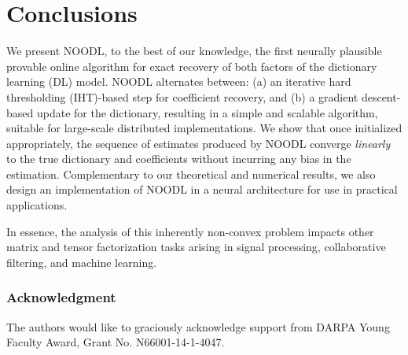 \documentclass{article}
\begin{document}
\section{Conclusions}
\vspace{-7pt}


We present NOODL, to the best of our knowledge, the first neurally plausible provable online algorithm for exact recovery of both factors of the dictionary learning (DL) model. NOODL alternates between: (a) an iterative hard thresholding (IHT)-based step for coefficient recovery, and (b) a gradient descent-based update for the dictionary, resulting in a simple and scalable algorithm, suitable for large-scale distributed implementations. We show that once initialized appropriately, the sequence of estimates produced by NOODL converge \textit{linearly} to the true dictionary and coefficients without incurring any bias in the estimation.  Complementary to our theoretical and numerical results, we also design an implementation of NOODL in a neural architecture for use in practical applications. 

In essence, the analysis of this inherently non-convex problem impacts other matrix and tensor factorization tasks arising in signal processing, collaborative filtering, and machine learning. 

\vspace*{-20pt}
\subsubsection*{Acknowledgment}
\vspace*{-4pt}
 The authors would like to graciously acknowledge support from DARPA Young Faculty Award, Grant No. N66001-14-1-4047.
\vspace*{-4pt}
\setlength{\bibsep}{6.5pt plus 10pt}



\newpage
\end{document}
